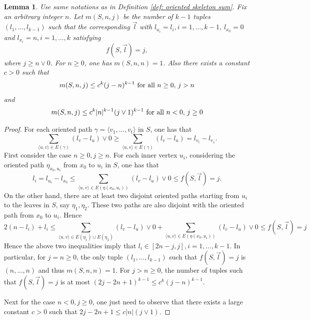 \documentclass[12pt]{article}
\newtheorem{lemma}[theorem]{Lemma}
\numberwithin{equation}{section}
\newcommand{\be}{\begin{equation}}
\newcommand{\ee}{\end{equation}}
\newcommand{\1}{\mathbf{1}}
\begin{document}
\begin{lemma}\label{lem: A.5 in appendix}
	Use same notations as in Definition \ref{def: oriented skeleton sum}. Fix an arbitrary integer $n$.  Let
	$m(S,n,j)$ be the number of $k-1$ tuples $(l_{1},\ldots,l_{k-1})$ such that the corresponding $\vec{l}$ with $l_{u_i}=l_i,i=1,\ldots,k-1$, $l_{x_0}=0$ and $l_{x_i}=n,i=1,\ldots,k$ satisfying 
	\[
	f(S,\vec{l})=j,
	\] where $j\geq n\vee 0$.
	For $n\geq0$, one has $m(S,n,n)=1$.
	Also there exists a constant $c>0$ such that 
	\be
	m(S,n,j)\leq c^k(j-n)^{k-1}\textnormal{ for all } n\geq0,\,  j>n
	\ee
	and 
	\be
	m(S,n,j)\leq c^k|n|^{k-1}(j\vee 1)^{k-1}\textnormal{ for all } n<0,\, j\geq0
	\ee
\end{lemma}
\begin{proof}
	For each oriented path $\gamma=\langle v_1,\ldots,v_t\rangle$ in $S$, one has that \[
	\sum_{\langle u,v\rangle \in E(\gamma)}{(l_v-l_u)\vee0}\geq 
	\sum_{\langle u,v\rangle \in E(\gamma)}{(l_v-l_u)}=l_{v_t}-l_{v_1}.
	\]
	First consider the case $n\geq0,j\geq n$. For each inner vertex $u_i$,  considering the oriented path $\eta_{x_0,u_i}$ from $x_0$ to $u_i$ in $S$, one has that 
	\[
	l_i=l_{u_i}-l_{x_0}\leq \sum_{\langle u,v\rangle \in E(\eta(x_0,u_i))}{(l_v-l_u)\vee0}
	\leq f(S,\vec{l})=j.
	\]
	On the other hand, there are at least two disjoint oriented paths starting from $u_i$ to the leaves in $S$, say $\eta_1,\eta_2$. These two paths are also disjoint with the oriented path from $x_0$ to $u_i$.
	Hence 
	\[
	2(n-l_i)+l_i\leq \sum_{\langle u,v\rangle \in E(\eta_1)\cup E(\eta_2)}{(l_v-l_u)\vee0}+\sum_{\langle u,v\rangle \in E(\eta(x_0,u_i))}{(l_v-l_u)\vee0}\leq f(S,\vec{l})=j
	\]
	Hence the above two inequalities imply that $l_i\in[2n-j,j],i=1,\ldots,k-1$. In particular, for $j=n\geq0$, the only tuple $(l_{1},\ldots,l_{k-1})$ such that $f(S,\vec{l})=j$ is $(n,\ldots,n)$ and thus $m(S,n,n)=1$. For $j>n\geq0$, the number of tuples such that $f(S,\vec{l})=j$ is at most $(2j-2n+1)^{k-1}\leq c^k(j-n)^{k-1}$. 
	
	Next for the case $n<0,j\geq0$, one just need to observe that there exists a large constant $c>0$ such that $2j-2n+1\leq c|n|(j\vee 1)$. 
\end{proof}
\end{document}
